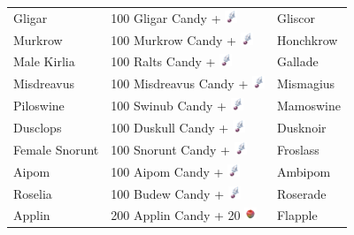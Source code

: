 \begin{table}[ht]
\begin{center}
\begin{tabular}{lll}
    Gligar & 100 Gligar Candy + \includegraphics[width=1em,height=1em]{images/sinnohstone.png} & Gliscor	\\
    Murkrow & 100 Murkrow Candy + \includegraphics[width=1em,height=1em]{images/sinnohstone.png} & Honchkrow	\\
    Male Kirlia & 100 Ralts Candy + \includegraphics[width=1em,height=1em]{images/sinnohstone.png} & Gallade	\\
    Misdreavus & 100 Misdreavus Candy + \includegraphics[width=1em,height=1em]{images/sinnohstone.png} & Mismagius	\\
    Piloswine & 100 Swinub Candy + \includegraphics[width=1em,height=1em]{images/sinnohstone.png} & Mamoswine	\\
    Dusclops & 100 Duskull Candy + \includegraphics[width=1em,height=1em]{images/sinnohstone.png} & Dusknoir	\\
    Female Snorunt & 100 Snorunt Candy + \includegraphics[width=1em,height=1em]{images/sinnohstone.png} & Froslass	\\
    Aipom & 100 Aipom Candy + \includegraphics[width=1em,height=1em]{images/sinnohstone.png} & Ambipom	\\
    Roselia & 100 Budew Candy + \includegraphics[width=1em,height=1em]{images/sinnohstone.png} & Roserade	\\
    Applin & 200 Applin Candy + 20 \includegraphics[width=1em,height=1em]{images/tartapple.png} & Flapple \\

\end{tabular}
\end{center}
\end{table}
